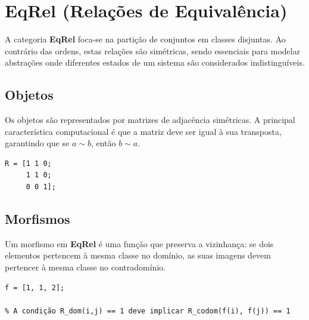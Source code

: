 \section{EqRel (Relações de Equivalência)}

A categoria \textbf{EqRel} foca-se na partição de conjuntos em classes disjuntas. Ao contrário das ordens, estas relações são simétricas, sendo essenciais para modelar abstrações onde diferentes estados de um sistema são considerados indistinguíveis.

\subsection{Objetos}
Os objetos são representados por matrizes de adjacência simétricas. A principal característica computacional é que a matriz deve ser igual à sua transposta, garantindo que se $a \sim b$, então $b \sim a$.

\begin{lstlisting}[caption={Matriz Simétrica de Equivalência}]
% Exemplo: Duas classes de equivalência {1,2} e {3}
R = [1 1 0;
     1 1 0;
     0 0 1];
\end{lstlisting}

\subsection{Morfismos}
Um morfismo em \textbf{EqRel} é uma função que preserva a vizinhança: se dois elementos pertencem à mesma classe no domínio, as suas imagens devem pertencer à mesma classe no contradomínio.

\begin{lstlisting}[caption={Teste de Preservação de Classe}]
% f mapeia os elementos do conjunto original
f = [1, 1, 2]; 

% A condição R_dom(i,j) == 1 deve implicar R_codom(f(i), f(j)) == 1
\end{lstlisting}